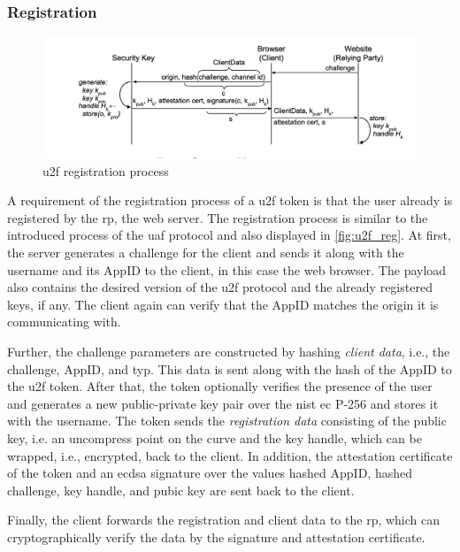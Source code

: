 \subsubsection{Registration}

\begin{figure}[hbt]
	\centering
	\includegraphics[width=\textwidth]{pics/u2f_reg}
	\caption[\gls{u2f} registration process]{\gls{u2f} registration process\footnotemark}
	\label{fig:u2f_reg}
\end{figure}

A requirement of the registration process of a \gls{u2f} token is that the user already is registered by the \gls{rp}, the web server. The registration process is similar to the introduced process of the \gls{uaf} protocol and also displayed in \autoref{fig:u2f_reg}. At first, the server generates a challenge for the client and sends it along with the username and its AppID to the client, in this case the web browser. The payload also contains the desired version of the \gls{u2f} protocol and the already registered keys, if any. The client again can verify that the AppID matches the origin it is communicating with.

Further, the challenge parameters are constructed by hashing \textit{client data}, i.e., the challenge, AppID, and typ. This data is sent along with the hash of the AppID to the \gls{u2f} token. After that, the token optionally verifies the presence of the user and generates a new public-private key pair over the \gls{nist} \gls{ec} P-256 and stores it with the username. The token sends the \textit{registration data} consisting of the public key, i.e. an uncompress point on the curve and the key handle, which can be wrapped, i.e., encrypted, back to the client. In addition, the attestation certificate of the token and an \gls{ecdsa} signature over the values hashed AppID, hashed challenge, key handle, and pubic key are sent back to the client.

Finally, the client forwards the registration and client data to the \gls{rp}, which can cryptographically verify the data by the signature and attestation certificate.


